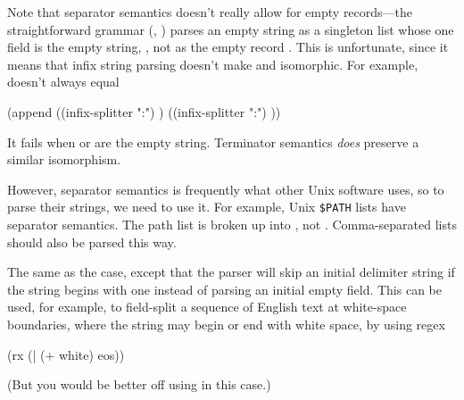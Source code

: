\begin{desc}
\begin{description}
    Note that separator semantics doesn't really allow for empty 
    records---the straightforward grammar (\ie, ) 
    parses an empty string as a singleton list whose one field is the empty 
    string, , not as the empty record \ex{()}. This is unfortunate, 
    since it means that infix string parsing doesn't make 
    and  isomorphic. For example,
    doesn't always equal
\begin{code}    
(append ((infix-splitter ":") )
        ((infix-splitter ":") ))\end{code}
    It fails when  or  are the empty string. 
    Terminator semantics \emph{does} preserve a similar isomorphism.

    However, separator semantics is frequently what other Unix software
    uses, so to parse their strings, we need to use it. For example,
    Unix \verb|$PATH| lists have separator semantics. The path list 
     is broken up into , not . 
    Comma-separated lists should also be parsed this way.

    \item[\ex{sloppy-suffix}]
    The same as the  case, except that the parser will skip an
    initial delimiter string if the string begins with one instead of parsing 
    an initial empty field. This can be used, for example, to field-split a
    sequence of English text at white-space boundaries, where the string may
    begin or end with white space, by using regex
\begin{code}{(rx (| (+ white) eos))}\end{code}
    (But you would be better off using  in this case.)
    \end{description}
    \end{desc}

